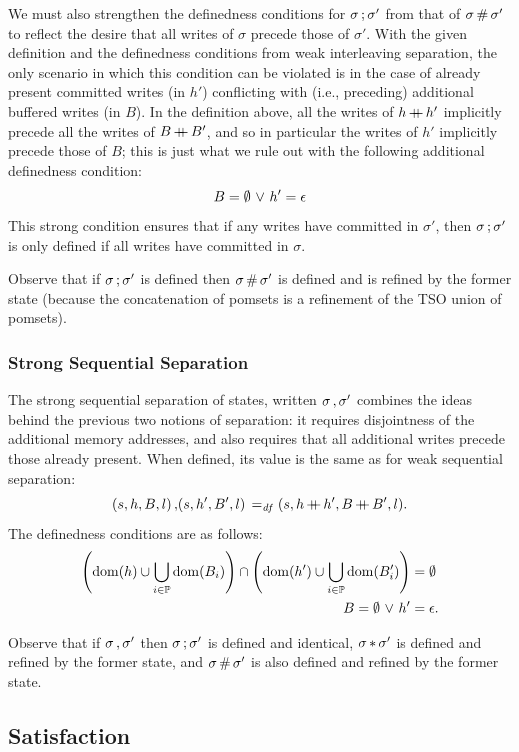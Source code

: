 \documentclass[11pt]{article}
\begin{document}
We must also strengthen the definedness conditions for $\sigma \operatorname{;} \sigma'$ from that of $\sigma \operatorname{\#} \sigma'$ to reflect the desire that all writes of $\sigma$ precede those of $\sigma'$. With the given definition and the definedness conditions from weak interleaving separation, the only scenario in which this condition can be violated is in the case of already present committed writes (in $h'$) conflicting with (i.e., preceding) additional buffered writes (in $B$). In the definition above, all the writes of $h \operatorname{+\!\!\!+} h'$ implicitly precede all the writes of $B \operatorname{+\!\!\!+} B'$, and so in particular the writes of $h'$ implicitly precede those of $B$; this is just what we rule out with the following additional definedness condition: \[ B = \operatorname{\emptyset} \operatorname{\,\vee\,} h' = \epsilon \] This strong condition ensures that if any writes have committed in $\sigma'$, then $\sigma \operatorname{;} \sigma'$ is only defined if all writes have committed in $\sigma$. 

Observe that if $\sigma \operatorname{;} \sigma'$ is defined then $\sigma \operatorname{\#} \sigma'$ is defined and is refined by the former state (because the concatenation of pomsets is a refinement of the TSO union of pomsets). 

\subsubsection{Strong Sequential Separation}

The strong sequential separation of states, written $\sigma \operatorname{,} \sigma'$ combines the ideas behind the previous two notions of separation: it requires disjointness of the additional memory addresses, and also requires that all additional writes precede those already present. When defined, its value is the same as for weak sequential separation: \[ (s,h,B,l) \operatorname{,} (s,h',B',l) \operatorname{\;=_{\mathit{df}}\;} (s,h \operatorname{+\!\!\!+} h', B \operatorname{+\!\!\!+} B',l).\] The definedness conditions are as follows: \begin{align*}
	\left(\operatorname{\mathrm{dom}}(h) \cup \bigcup_{i \in \mathbb{P}} \operatorname{\mathrm{dom}}(B_i) \right) \cap \left( \operatorname{\mathrm{dom}}(h') \cup \bigcup_{i \in \mathbb{P}} \operatorname{\mathrm{dom}}(B'_i)\right) & = \operatorname{\emptyset} \\ 
	B = \operatorname{\emptyset} \operatorname{\,\vee\,} h' & = \epsilon.
\end{align*}

Observe that if $\sigma \operatorname{,} \sigma'$ then $\sigma \operatorname{;} \sigma'$ is defined and identical, $\sigma \operatorname{\ast} \sigma'$ is defined and refined by the former state, and $\sigma \operatorname{\#} \sigma'$ is also defined and refined by the former state.

\subsection{Satisfaction}
\end{document}
